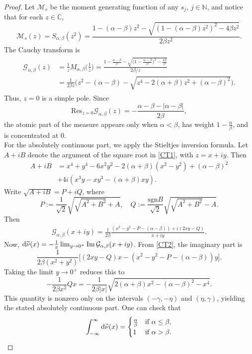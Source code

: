 \documentclass[12pt]{amsart}
\numberwithin{equation}{section}
\def\cam{{\mathcal M}}
\def\bc{{\mathbb C}}
\def\bn{{\mathbb N}}
\def\a{\alpha}
\def\b{\beta}
\theoremstyle{definition}
\def\di{\mathop{\rm d}\!}
\def\di{{\rm d}}
\begin{document}
\begin{proof}
Let $\cam_s$ be the moment generating function of any $s_j$, $j\in\bn$, and notice that for each $z\in\bc$,
\[
\cam_s(z) = S_{\a,\b}(z^2) = \frac{1 - (\alpha-\beta) z^2 - \sqrt{(1-(\alpha-\beta) z^2)^2 - 4 \beta z^2}}{2 \beta z^2}.
\]
The Cauchy transform is
\begin{align}
\begin{split}
\label{CT1}
\mathcal{G}_{\a,\b}(z)
&= \frac{1}{z} M_{\a,\b}\Big(\frac{1}{z}\Big)
= \frac{1 - \frac{\alpha-\beta}{z^2} - \sqrt{\big(1 - \frac{\alpha-\beta}{z^2}\big)^2 - \frac{4 \beta}{z^2}}}{2 \beta / z} \\
&= \frac{1}{2 \beta z} \big( z^2 - (\alpha-\beta) - \sqrt{z^4 - 2(\alpha+\beta) z^2 + (\alpha-\beta)^2} \big).
\end{split}
\end{align}
Thus, $z=0$ is a simple pole. Since
\[
\text{Res}_{z=0} \mathcal{G}_{\a,\b}(z) = -\frac{\a-\b-|\a-\b|}{2\b},
\]
the atomic part of the measure appears only when $\a < \b$, has weight $1 - \frac{\a}{\b}$, and is concentrated at 0.\\
For the absolutely continuous part, we apply the Stieltjes inversion formula. Let $A + iB$ denote the argument of the square root in \eqref{CT1}, with $z = x + iy$. Then
\begin{align*}
A + iB &= x^4 + y^4 - 6 x^2 y^2 - 2 (\alpha+\beta)(x^2 - y^2) + (\alpha-\beta)^2\\
&+ 4 i (x^3 y - x y^3 - (\alpha+\beta) x y).
\end{align*}
Write $\sqrt{A+iB} = P + iQ$, where
\[
P := \frac{1}{\sqrt{2}} \sqrt{\sqrt{A^2 + B^2} + A}, \quad Q := \frac{\mathrm{sgn} B}{\sqrt{2}} \sqrt{\sqrt{A^2 + B^2} - A}.
\]
Then
\begin{align}\label{CT2}
\mathcal{G}_{\a,\b}(x+iy) = \frac{1}{2 \beta} \frac{(x^2 - y^2 - P - (\alpha-\beta)) + i(2xy - Q)}{x + iy}.
\end{align}
Now, $\di \widetilde{\nu}(x) = -\frac{1}{\pi} \lim_{y \to 0^+} \mathrm{Im} \, \mathcal{G}_{\a,\b}(x + iy)$. From \eqref{CT2}, the imaginary part is
\[
\frac{1}{2 \beta (x^2 + y^2)} \big[ (2xy - Q) x - (x^2 - y^2 - P - (\alpha-\beta)) y \big].
\]
Taking the limit $y \to 0^+$ reduces this to
\[
-\frac{1}{2 \beta x^2} Q x = -\frac{1}{2 \beta |x|} \sqrt{2 (\alpha+\beta) x^2 - (\alpha-\beta)^2 - x^4}.
\]
This quantity is nonzero only on the intervals $(-\gamma, -\eta)$ and $(\eta, \gamma)$, yielding the stated absolutely continuous part. One can check that
\[
\int_{-\infty}^\infty \di \widetilde{\nu}(x) =
\begin{cases}
\frac{\a}{\b} & \text{if $\a \le \b$,} \\
1 & \text{if $\a > \b$.}
\end{cases}
\]
\end{proof}
\end{document}

